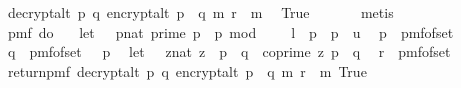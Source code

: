 \begin{isabellebody}
\ {\isasymor}\ decrypt{\isacharunderscore}{\kern0pt}alt\ p\ q\ {\isacharparenleft}{\kern0pt}encrypt{\isacharunderscore}{\kern0pt}alt\ {\isacharparenleft}{\kern0pt}p\ {\isacharasterisk}{\kern0pt}\ q{\isacharparenright}{\kern0pt}\ m\ r{\isacharparenright}{\kern0pt}\ {\isacharequal}{\kern0pt}\ m{\isacharparenright}{\kern0pt}{\isacharbraceright}{\kern0pt}{\isacharparenright}{\kern0pt}\isanewline
\ \ True{\isachardoublequoteclose}\ \isanewline
\ \ \ \ \isamarkupfalse%
\ metis\isanewline
\isanewline
\ \ \isamarkupfalse%
\ \isamarkupfalse%
\ \ {\isachardoublequoteopen}\isanewline
\ \ pmf\ {\isacharparenleft}{\kern0pt}do\ {\isacharbraceleft}{\kern0pt}\isanewline
\ \ let\ {\isasymK}\ {\isacharequal}{\kern0pt}\ {\isacharbraceleft}{\kern0pt}{\isacharparenleft}{\kern0pt}p{\isacharcolon}{\kern0pt}{\isacharcolon}{\kern0pt}nat{\isacharparenright}{\kern0pt}{\isachardot}{\kern0pt}\ prime\ p\ {\isasymand}\ p\ mod\ {}\ {\isacharequal}{\kern0pt}\ {}\ {\isasymand}\ l\ {\isasymle}\ p\ {\isasymand}\ p\ {\isasymle}\ u{\isacharbraceright}{\kern0pt}{\isacharsemicolon}{\kern0pt}\isanewline
\ \ p\ {\isasymleftarrow}\ pmf{\isacharunderscore}{\kern0pt}of{\isacharunderscore}{\kern0pt}set\ {\isasymK}{\isacharsemicolon}{\kern0pt}\ \isanewline
\ \ q\ {\isasymleftarrow}\ pmf{\isacharunderscore}{\kern0pt}of{\isacharunderscore}{\kern0pt}set\ {\isacharparenleft}{\kern0pt}{\isasymK}\ {\isacharminus}{\kern0pt}\ {\isacharbraceleft}{\kern0pt}p{\isacharbraceright}{\kern0pt}{\isacharparenright}{\kern0pt}{\isacharsemicolon}{\kern0pt}\isanewline
\ \ let\ {\isasymZ}\ {\isacharequal}{\kern0pt}\ {\isacharbraceleft}{\kern0pt}{\isacharparenleft}{\kern0pt}z{\isacharcolon}{\kern0pt}{\isacharcolon}{\kern0pt}nat{\isacharparenright}{\kern0pt}{\isachardot}{\kern0pt}\ z\ {\isacharless}{\kern0pt}\ p\ {\isacharasterisk}{\kern0pt}\ q\ {\isasymand}\ coprime\ z\ {\isacharparenleft}{\kern0pt}p\ {\isacharasterisk}{\kern0pt}\ q{\isacharparenright}{\kern0pt}{\isacharbraceright}{\kern0pt}{\isacharsemicolon}{\kern0pt}\isanewline
\ \ r\ {\isasymleftarrow}\ pmf{\isacharunderscore}{\kern0pt}of{\isacharunderscore}{\kern0pt}set\ {\isasymZ}{\isacharsemicolon}{\kern0pt}\isanewline
\ \ return{\isacharunderscore}{\kern0pt}pmf\ {\isacharparenleft}{\kern0pt}decrypt{\isacharunderscore}{\kern0pt}alt\ p\ q\ {\isacharparenleft}{\kern0pt}encrypt{\isacharunderscore}{\kern0pt}alt\ {\isacharparenleft}{\kern0pt}p\ {\isacharasterisk}{\kern0pt}\ q{\isacharparenright}{\kern0pt}\ m\ r{\isacharparenright}{\kern0pt}\ {\isacharequal}{\kern0pt}\ m{\isacharparenright}{\kern0pt}{\isacharbraceright}{\kern0pt}{\isacharparenright}{\kern0pt}\ True\isanewline

\end{isabellebody}
